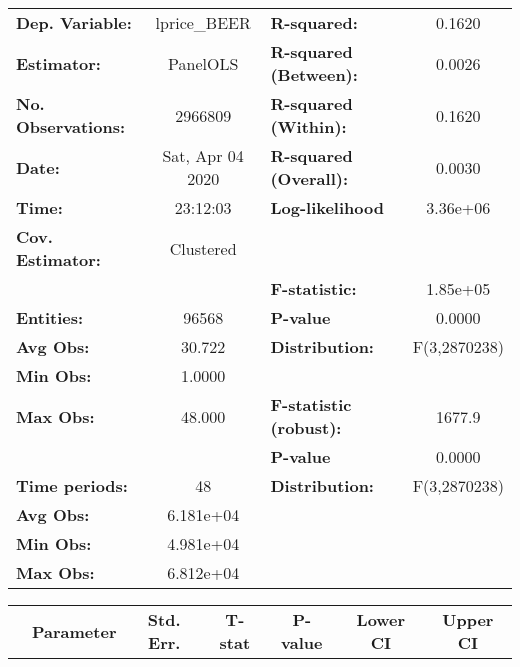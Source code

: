 \documentclass{report}
\begin{document}
\begin{center}
\begin{tabular}{lclc}
\toprule
\textbf{Dep. Variable:}    &    lprice\_BEER    & \textbf{  R-squared:         }   &      0.1620      \\
\textbf{Estimator:}        &      PanelOLS      & \textbf{  R-squared (Between):}  &      0.0026      \\
\textbf{No. Observations:} &      2966809       & \textbf{  R-squared (Within):}   &      0.1620      \\
\textbf{Date:}             &  Sat, Apr 04 2020  & \textbf{  R-squared (Overall):}  &      0.0030      \\
\textbf{Time:}             &      23:12:03      & \textbf{  Log-likelihood     }   &     3.36e+06     \\
\textbf{Cov. Estimator:}   &     Clustered      & \textbf{                     }   &                  \\
\textbf{}                  &                    & \textbf{  F-statistic:       }   &     1.85e+05     \\
\textbf{Entities:}         &       96568        & \textbf{  P-value            }   &      0.0000      \\
\textbf{Avg Obs:}          &       30.722       & \textbf{  Distribution:      }   &   F(3,2870238)   \\
\textbf{Min Obs:}          &       1.0000       & \textbf{                     }   &                  \\
\textbf{Max Obs:}          &       48.000       & \textbf{  F-statistic (robust):} &      1677.9      \\
\textbf{}                  &                    & \textbf{  P-value            }   &      0.0000      \\
\textbf{Time periods:}     &         48         & \textbf{  Distribution:      }   &   F(3,2870238)   \\
\textbf{Avg Obs:}          &     6.181e+04      & \textbf{                     }   &                  \\
\textbf{Min Obs:}          &     4.981e+04      & \textbf{                     }   &                  \\
\textbf{Max Obs:}          &     6.812e+04      & \textbf{                     }   &                  \\
\bottomrule
\end{tabular}
\begin{tabular}{lcccccc}
                           & \textbf{Parameter} & \textbf{Std. Err.} & \textbf{T-stat} & \textbf{P-value} & \textbf{Lower CI} & \textbf{Upper CI}  \\

\end{tabular}
\end{center}
\end{document}
